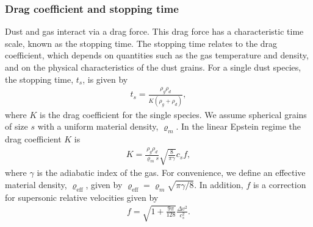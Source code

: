 \documentclass[fleqn,usenatbib]{mnras}
\begin{document}
\subsubsection{Drag coefficient and stopping time}

Dust and gas interact via a drag force. This drag force has a characteristic
time scale, known as the stopping time. The stopping time relates to the drag
coefficient, which depends on quantities such as the gas temperature and
density, and on the physical characteristics of the dust grains. For a single
dust species, the stopping time, \(t_s\), is given by
%
\begin{align}
   \label{eqn:single-stopping-time}
   t_s = \frac{\rho_g \rho_d}{K (\rho_g + \rho_d)},
\end{align}
%
where \(K\) is the drag coefficient for the single species. We assume spherical
grains of size \(s\) with a uniform material density, \(\varrho_m\). In the
linear Epstein regime \citep{Epstein1924PhRv...23..710E} the drag coefficient
\(K\) is
%
\begin{align}
   \label{eqn:single-drag-coefficient}
   K = \frac{\rho_g \rho_d}{\varrho_m s} \sqrt{\frac{8}{\pi\gamma}} c_s f,
\end{align}
%
where \(\gamma\) is the adiabatic index of the gas. For convenience, we define
an effective material density, \(\varrho_{\mathrm{eff}}\), given by
\(\varrho_{\mathrm{eff}} = \varrho_m \sqrt{\pi\gamma/8}\). In addition, \(f\) is
a correction for supersonic relative velocities given by
\citep{Kwok1975ApJ...198..583K}
%
\begin{align}
   \label{eqn:supersonic}
   f = \sqrt{1 + \frac{9\pi}{128}} \frac{\Delta v^2}{c_s^2}.
\end{align}
%
\end{document}
